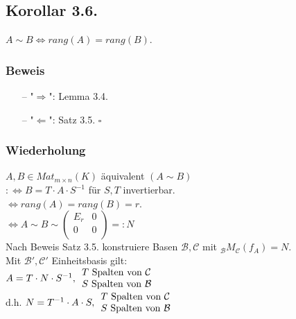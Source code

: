 \documentclass[a4paper,twoside]{article}
\newcommand{\tn}[1]{\textnormal {#1}}
\begin{document}
\subsection*{Korollar 3.6.}
$A \sim B \Leftrightarrow rang(A) = rang(B)$.
\subsubsection*{Beweis}
\begin{itemize}
	\item[--] "$\Rightarrow$": Lemma 3.4.
	\item[--] "$\Leftarrow$": Satz 3.5. $\square$
\end{itemize}
\subsubsection*{Wiederholung}
$A,B \in Mat_{m \times n}(K)$ äquivalent $(A\sim B)$ \\
$ :\Leftrightarrow B = T \cdot A \cdot S^{-1}$ für $S, T$ invertierbar.\\
$\Leftrightarrow rang(A) = rang(B) = r$. \\
$\Leftrightarrow A \sim B \sim 
\left( \begin{matrix} 
E_r & 0 \\
0 & 0 \\
\end{matrix} \right) =: N$\\
Nach Beweis Satz 3.5. konstruiere Basen $\mathcal{B},\mathcal{C}$ mit $_\mathcal{B}M_\mathcal{C}(f_A) = N$.\\
Mit $\mathcal{B'}, \mathcal{C'}$ Einheitsbasis gilt:\\
$A = T \cdot N \cdot S^{-1}, \begin{array}{ll}
T \tn{ Spalten von } \mathcal{C}\\
S \tn{ Spalten von } \mathcal{B}\\
\end{array}
$\\
d.h. $N = T^{-1} \cdot A \cdot S,  \begin{array}{ll}
T \tn{ Spalten von } \mathcal{C}\\
S \tn{ Spalten von } \mathcal{B}\\
\end{array}$\\
\end{document}
